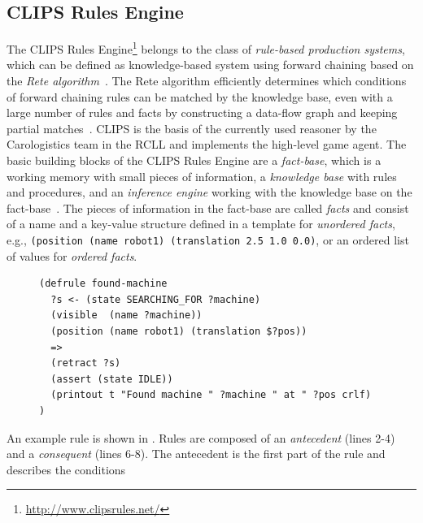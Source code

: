\subsection{CLIPS Rules Engine}
The CLIPS Rules Engine\footnote{\url{http://www.clipsrules.net/}} belongs to the class of \emph{rule-based
  production systems}, which can be defined as knowledge-based system
using forward chaining based on the \emph{Rete
  algorithm}~\cite{aimodern}. The Rete algorithm efficiently determines
which conditions of forward chaining rules can be matched by the
knowledge base, even with a large number of rules and facts by
constructing a data-flow graph and keeping partial
matches~\cite{Rete}. CLIPS is the basis of the currently used reasoner
by the Carologistics team in the RCLL and implements the high-level
game agent. The basic building blocks of the CLIPS Rules Engine are a
\emph{fact-base}, which is a working memory with small pieces of
information, a \emph{knowledge base} with rules and procedures, and an
\emph{inference engine} working with the knowledge base on the
fact-base~\cite{CLIPS-RM}. The pieces of information in the fact-base
are called \emph{facts} and consist of a name and a key-value
structure defined in a template for \emph{unordered facts},
e.g., \texttt{(position~(name~robot1)~(translation~2.5~1.0~0.0)}, or an
ordered list of values for \emph{ordered facts}.
\begin{figure}
\begin{lstlisting}[showlines,style=ReallySmallCLIPS, caption={CLIPS
    rule to change a robots state when the object it searched for is visible.},
  label=lst:clips-rule,
  emph={skill, args, state, target, res},
  emphstyle=\bfseries\color{green!80!black},
  emph={[2]\?skill, \$\?args, wait-for-lock, \?target, use,
  WAIT-FOR-LOCK, SKILL-EXECUTION, running},
  emphstyle={[2]\bfseries\color{blue!80!black}},
  morekeywords={retract, assert, modify, skill-call, skill-to-execute,
  wait-for-lock}]
(defrule found-machine
  ?s <- (state SEARCHING_FOR ?machine)
  (visible  (name ?machine))
  (position (name robot1) (translation $?pos))
  =>  
  (retract ?s) 
  (assert (state IDLE))
  (printout t "Found machine " ?machine " at " ?pos crlf)
)
\end{lstlisting} %
\end{figure}
An example rule is shown in . Rules are
composed of an \emph{antecedent} (lines 2-4) and a \emph{consequent} (lines 6-8). The
antecedent is the first part of the rule and describes the conditions
